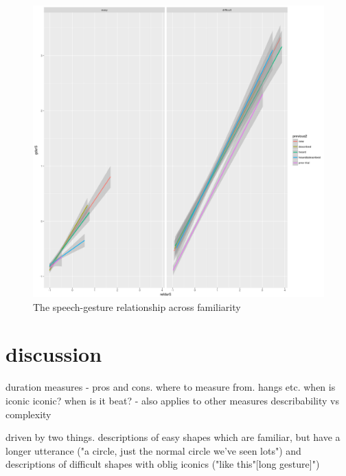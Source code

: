 \documentclass[a4paper,man,natbib]{apa6}
\newcommand\blankpage{%
    \null
    \thispagestyle{empty}%
    \addtocounter{page}{-1}%
    \newpage}
\begin{document}
\begin{figure}
  \centering
	\includegraphics[width=\linewidth]{prev_plot.png}
  \caption{The speech-gesture relationship across familiarity}
  \label{fig:prev}
\end{figure}





\section{discussion}
duration measures - pros and cons.
where to measure from. hangs etc. 
when is iconic iconic? when is it beat? - also applies to other measures 
describability vs complexity

driven by two things.
descriptions of easy shapes which are familiar, but have a longer utterance ("a circle, just the normal circle we've seen lots")
and descriptions of difficult shapes with oblig iconics ("like this"[long gesture]")

\afterpage{\blankpage}


\end{document}
